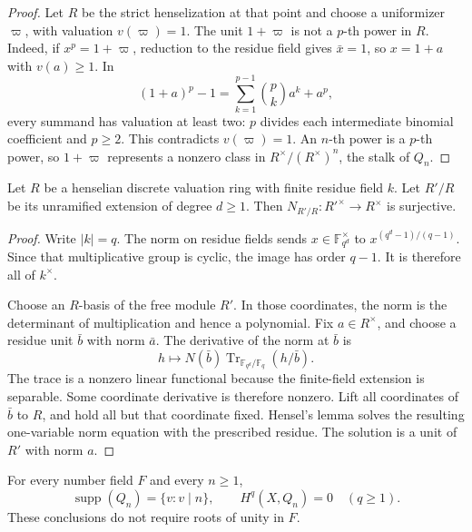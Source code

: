 \begin{proof}
Let \(R\) be the strict henselization at that point and choose a
uniformizer \(\varpi\), with valuation \(v(\varpi)=1\).
The unit \(1+\varpi\) is not a \(p\)-th power in \(R\).
Indeed, if \(x^p=1+\varpi\), reduction to the residue field gives
\(\bar x=1\), so \(x=1+a\) with \(v(a)\geq1\). In
\[
 (1+a)^p-1=\sum_{k=1}^{p-1}\binom pk a^k+a^p,
\]
every summand has valuation at least two: \(p\) divides each
intermediate binomial coefficient and \(p\geq2\).
This contradicts \(v(\varpi)=1\). An \(n\)-th power is a
\(p\)-th power, so \(1+\varpi\) represents a nonzero class in
\(R^\times/(R^\times)^n\), the stalk of \(Q_n\).
\end{proof}

\begin{lemma}
\label{lem:do26-norm}
Let \(R\) be a henselian discrete valuation ring with finite residue
field \(k\).  Let \(R'/R\) be its unramified extension of degree
\(d\geq1\).  Then
\(N_{R'/R}:R'^\times\to R^\times\) is surjective.
\end{lemma}

\begin{proof}
Write \(|k|=q\).  The norm on residue fields sends
\(x\in\mathbb F_{q^d}^\times\) to
\(x^{(q^d-1)/(q-1)}\).  Since that multiplicative group is cyclic,
the image has order \(q-1\).  It is therefore all of \(k^\times\).

Choose an \(R\)-basis of the free module \(R'\).  In those coordinates,
the norm is the determinant of multiplication and hence a polynomial.
Fix \(a\in R^\times\), and choose a residue unit \(\bar b\) with
norm \(\bar a\).  The derivative of the norm at \(\bar b\) is
\[
 h\longmapsto N(\bar b)
       \operatorname{Tr}_{\mathbb F_{q^d}/\mathbb F_q}(h/\bar b).
\]
The trace is a nonzero linear functional because the finite-field
extension is separable.  Some coordinate derivative is therefore nonzero.
Lift all coordinates of \(\bar b\) to \(R\), and hold all but that
coordinate fixed.  Hensel's lemma solves the resulting one-variable norm
equation with the prescribed residue.  The solution is a unit of \(R'\)
with norm \(a\).
\end{proof}

\begin{lemma}
\label{lem:do26-defect}
For every number field \(F\) and every \(n\geq1\),
\[
 \operatorname{supp}(Q_n)=\{v:v\mid n\},
 \qquad H^q(X,Q_n)=0\quad(q\geq1).
\]
These conclusions do not require roots of unity in \(F\).
\end{lemma}

